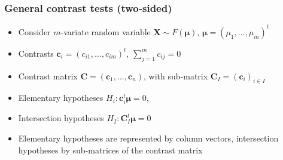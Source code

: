 \documentclass[bigger]{beamer}
\newcommand{\bs}[1]{\bm{#1}}
\begin{document}
% 



% 



\begin{frame}
\frametitle{General contrast tests (two-sided)}
\begin{itemize}

\item Consider $m$-variate random variable $\bs{X} \sim F(\bs{\mu})$, $\bs{\mu} = (\mu_1,...,\mu_m)^t$

\item Contrasts $\bs{c}_i = (c_{i1},...,c_{im})^t$, $\sum_{j = 1}^m
 c_{ij} = 0$
\item Contrast matrix  $\bs{C} = \left( \bs{c}_1,...,\bs{c}_n\right)$,
 with sub-matrix $\bs{C}_I = \left( \bs{c}_i \right)_{i \in
   I}$
\item Elementary hypotheses $H_i: \bs{c}_i^t\bs{\mu} = 0$,
\item Intersection hypotheses $H_I: \bs{C}_I^t\bs{\mu} = 0$

\item Elementary hypotheses are represented by column vectors,
 intersection hypotheses by sub-matrices of the contrast matrix

\end{itemize} %
\end{frame}
\end{document}

